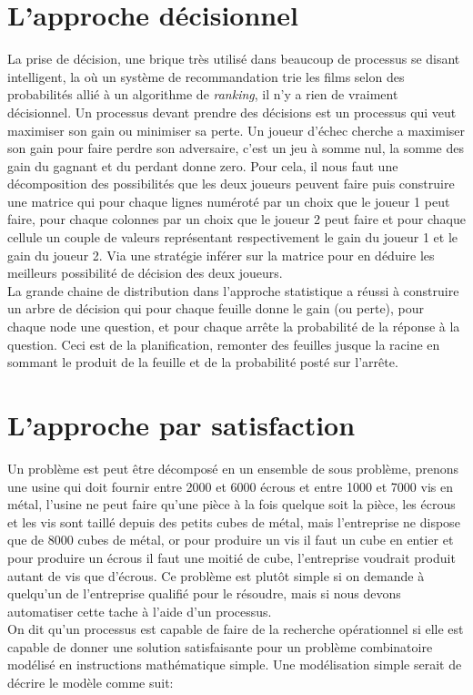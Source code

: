 \section{L'approche décisionnel}

La prise de décision, une brique très utilisé dans beaucoup de processus se disant intelligent, la où un système de recommandation trie les films selon des probabilités allié à un algorithme de \textit{ranking}, il n'y a rien de vraiment décisionnel. Un processus devant prendre des décisions est un processus qui veut maximiser son gain ou minimiser sa perte. Un joueur d'échec cherche a maximiser son gain pour faire perdre son adversaire, c'est un jeu à somme nul, la somme des gain du gagnant et du perdant donne zero. Pour cela, il nous faut une décomposition des possibilités que les deux joueurs peuvent faire puis construire une matrice qui pour chaque lignes numéroté par un choix que le joueur 1 peut faire, pour chaque colonnes par un choix que le joueur 2 peut faire et pour chaque cellule un couple de valeurs représentant respectivement le gain du joueur 1 et le gain du joueur 2. Via une stratégie inférer sur la matrice pour en déduire les meilleurs possibilité de décision des deux joueurs.\\
\linebreak
La grande chaine de distribution dans l'approche statistique a réussi à construire un arbre de décision qui pour chaque feuille donne le gain (ou perte), pour chaque node une question, et pour chaque arrête la probabilité de la réponse à la question. Ceci est de la planification, remonter des feuilles jusque la racine en sommant le produit de la feuille et de la probabilité posté sur l'arrête.\\
\pagebreak

\section{L'approche par satisfaction}

Un problème est peut être décomposé en un ensemble de sous problème, prenons une usine qui doit fournir entre 2000 et 6000 écrous et entre 1000 et 7000 vis en métal, l'usine ne peut faire qu'une pièce à la fois quelque soit la pièce, les écrous et les vis sont taillé depuis des petits cubes de métal, mais l'entreprise ne dispose que de 8000 cubes de métal, or pour produire un vis il faut un cube en entier et pour produire un écrous il faut une moitié de cube, l'entreprise voudrait produit autant de vis que d'écrous. Ce problème est plutôt simple si on demande à quelqu'un de l'entreprise qualifié pour le résoudre, mais si nous devons automatiser cette tache à l'aide d'un processus.\\
\linebreak
On dit qu'un processus est capable de faire de la recherche opérationnel si elle est capable de donner une solution satisfaisante pour un problème combinatoire modélisé en instructions mathématique simple. Une modélisation simple serait de décrire le modèle comme suit:

